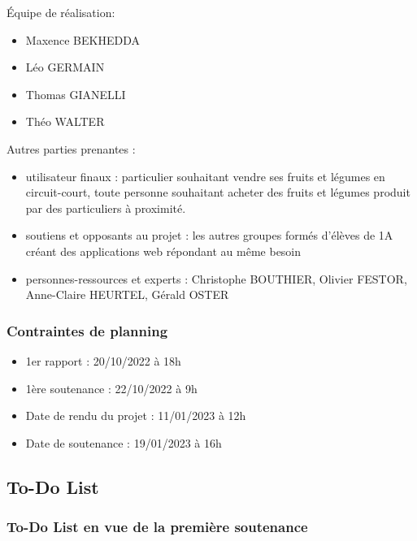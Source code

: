 \documentclass[11pt]{article}
\begin{document}
\vspace{0.2cm}

\noindent Équipe de réalisation:
\begin{itemize}
	\item Maxence BEKHEDDA
	\item Léo GERMAIN
	\item Thomas GIANELLI
	\item Théo WALTER
\end{itemize}

\vspace{0.2cm}

\noindent Autres parties prenantes :
\begin{itemize}
	\item utilisateur finaux : particulier souhaitant vendre ses fruits et légumes en circuit-court, toute personne souhaitant acheter des fruits et légumes produit par des particuliers à proximité.
		\item	soutiens et opposants au projet : les autres groupes formés d’élèves de 1A créant des applications web répondant au même besoin
		\item	personnes-ressources et experts : Christophe BOUTHIER, Olivier FESTOR, Anne-Claire HEURTEL, Gérald OSTER 
\end{itemize}


\subsubsection{Contraintes de planning}
\begin{itemize}
	\item 	1er rapport : 20/10/2022 à 18h
		\item	1ère soutenance : 22/10/2022 à 9h
		\item	Date de rendu du projet : 11/01/2023 à 12h
		\item	Date de soutenance : 19/01/2023 à 16h
\end{itemize}


\subsection{To-Do List}
\subsubsection{To-Do List en vue de la première soutenance}
\end{document}
